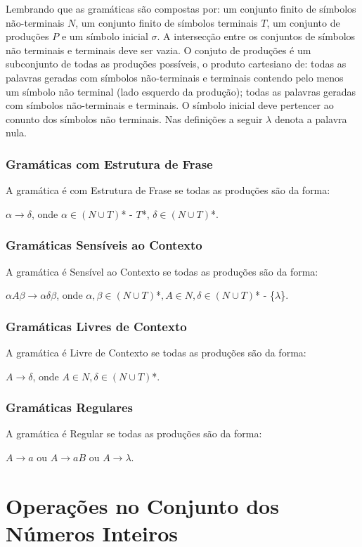 Lembrando que as gramáticas são compostas por: um conjunto finito de símbolos não-terminais $N$, um conjunto finito de símbolos terminais $T$, um conjunto de produções $P$ e um símbolo inicial $\sigma$. A intersecção entre os conjuntos de símbolos não terminais e terminais deve ser vazia. O conjuto de produções é um subconjunto de todas as produções possíveis, o produto cartesiano de: todas as palavras geradas com símbolos não-terminais e terminais contendo pelo menos um símbolo não terminal (lado esquerdo da produção); todas as palavras geradas com símbolos não-terminais e terminais. O símbolo inicial deve pertencer ao conunto dos símbolos não terminais. Nas definições a seguir $\lambda$ denota a palavra nula. \cite{chomClass}

\subsection{Gramáticas com Estrutura de Frase}
A gramática é com Estrutura de Frase se todas as produções são da forma:

$\alpha \to \delta$, onde $\alpha \in (N \cup T)$* - $T$*, $\delta \in (N \cup T)$*.

\subsection{Gramáticas Sensíveis ao Contexto}
A gramática é Sensível ao Contexto se todas as produções são da forma:

$\alpha A\beta \to \alpha \delta \beta$, onde $\alpha,\beta \in (N \cup T)$*$, A \in N, \delta \in (N \cup T)$* - \{$\lambda$\}.

\subsection{Gramáticas Livres de Contexto}
A gramática é Livre de Contexto se todas as produções são da forma:

$A \to \delta$, onde $A \in N, \delta \in (N \cup T)$*.

\subsection{Gramáticas Regulares}
A gramática é Regular se todas as produções são da forma:

$A \to a$ ou $A \to aB$ ou $A \to \lambda$.

\chapter{Operações no Conjunto dos Números Inteiros}

